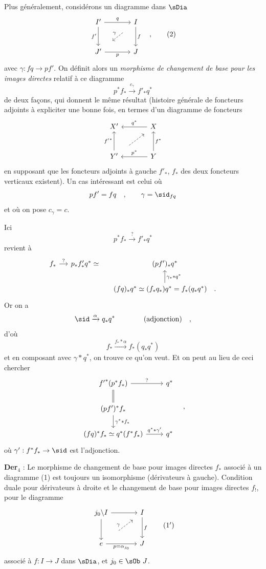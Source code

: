 Plus généralement, considérons un diagramme dans $\sDia$
\[
\begin{tikzcd}[row sep=large, column sep=large]
I' \arrow[r, "q"] \arrow[d, "f'"'] & I \arrow[d, "f"] \\
J' \arrow[r, "p"'] & J
\arrow[from=1-2, to=2-1, dashed, shorten <=14pt, shorten >=14pt, "\gamma"']
\end{tikzcd}
\quad ,
\tag*{(2)}
\]
avec $\gamma : fq \to pf'$. On définit alors un \textit{morphisme de changement de base pour les images directes} relatif à ce diagramme
\[ p^* f_* \xrightarrow{c_\gamma} f'_* q^* \]
de deux façons, qui donnent le même résultat (histoire générale de foncteurs adjoints à expliciter une bonne fois, en termes d'un diagramme de foncteurs
\[
\begin{tikzcd}[row sep=large, column sep=large]
X' & X \arrow[l, "q^*"'] \\
Y' \arrow[u, "{f'}^*"] & Y \arrow[l, "p^*"'] \arrow[u, "f^*"']
\arrow[from=2-1, to=1-2, dashed, shorten <=14pt, shorten >=6pt]
\end{tikzcd}
\]
en supposant que les foncteurs adjoints à gauche $f'_*$, $f_*$ des deux foncteurs verticaux existent). Un cas intéressant est celui où
\[ pf' = fq \quad , \qquad \gamma = \sid_{fq} \]
et où on pose $c_\gamma = c$.

Ici
\[ p^* f_* \xrightarrow{?} f'_* q^* \]
revient à
\[
\begin{tikzcd}[column sep=small]
f_* \arrow[r, "?"] & p_* f'_* q^* \simeq & (pf')_* q^* \\
 & & (fq)_* q^* \simeq (f_* q_*) q^* = f_*(q_* q^*) \quad . \arrow[u, "\gamma_* * q^*"']
\end{tikzcd}
\]
Or on a
\[ \sid \xrightarrow{\alpha} q_* q^* \qquad\qquad \text{(adjonction)} \quad , \]
d'où
\[ f_* \xrightarrow{f_* * \alpha} f_*(q_* q^*) \]
et en composant avec $\gamma * q^*$, on trouve ce qu'on veut. Et on peut au lieu de ceci chercher
\[
\begin{tikzcd}
{f'}^*(p^* f_*) \arrow[r, "?"] \arrow[d, equal] & q^* \\
(pf')^* f_* \arrow[d, "\gamma^* * f_*"] & \\
(fq)^* f_* \simeq q^*(f^* f_*) \arrow[r, "q^* * \gamma'"] & q^*
\end{tikzcd}
\quad ,
\]
où $\gamma' : f^* f_* \to \sid$ est l'adjonction.

\textbf{Der}$_4$ : Le morphisme de changement de base pour images directes $f_*$ associé à un diagramme (1) est toujours un isomorphisme (dérivateurs à gauche). Condition duale pour dérivateurs à droite et le changement de base pour images directes $f_!$, pour le diagramme
\[
\begin{tikzcd}[row sep=large, column sep=large]
j_0 \backslash I \arrow[r] \arrow[d] & I \arrow[d, "f"] \\
e \arrow[r, "p = \alpha_{j_0}"'] & J
\arrow[from=2-1, to=1-2, dashed, shorten <=22pt, shorten >=8pt, "\gamma"]
\end{tikzcd}
\tag*{(1$'$)}
\]
associé à $f : I \to J$ dans $\sDia$, et $j_0 \in \sOb\ J$.

